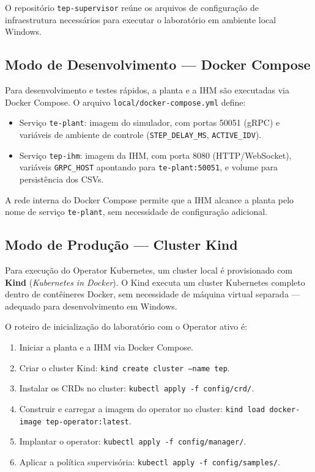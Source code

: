O repositório \texttt{tep-supervisor} reúne os arquivos de configuração de infraestrutura necessários para executar o laboratório em ambiente local Windows.

\subsection{Modo de Desenvolvimento — Docker Compose}

Para desenvolvimento e testes rápidos, a planta e a IHM são executadas via Docker Compose. O arquivo \texttt{local/docker-compose.yml} define:

\begin{itemize}
  \item Serviço \texttt{te-plant}: imagem do simulador, com portas 50051 (gRPC) e variáveis de ambiente de controle (\texttt{STEP\_DELAY\_MS}, \texttt{ACTIVE\_IDV}).
  \item Serviço \texttt{tep-ihm}: imagem da IHM, com porta 8080 (HTTP/WebSocket), variáveis \texttt{GRPC\_HOST} apontando para \texttt{te-plant:50051}, e volume para persistência dos CSVs.
\end{itemize}

A rede interna do Docker Compose permite que a IHM alcance a planta pelo nome de serviço \texttt{te-plant}, sem necessidade de configuração adicional.

\subsection{Modo de Produção — Cluster Kind}

Para execução do Operator Kubernetes, um cluster local é provisionado com \textbf{Kind} (\textit{Kubernetes in Docker}). O Kind executa um cluster Kubernetes completo dentro de contêineres Docker, sem necessidade de máquina virtual separada — adequado para desenvolvimento em Windows.

O roteiro de inicialização do laboratório com o Operator ativo é:

\begin{enumerate}
  \item Iniciar a planta e a IHM via Docker Compose.
  \item Criar o cluster Kind: \texttt{kind create cluster --name tep}.
  \item Instalar os CRDs no cluster: \texttt{kubectl apply -f config/crd/}.
  \item Construir e carregar a imagem do operator no cluster: \texttt{kind load docker-image tep-operator:latest}.
  \item Implantar o operator: \texttt{kubectl apply -f config/manager/}.
  \item Aplicar a política supervisória: \texttt{kubectl apply -f config/samples/}.
\end{enumerate}

